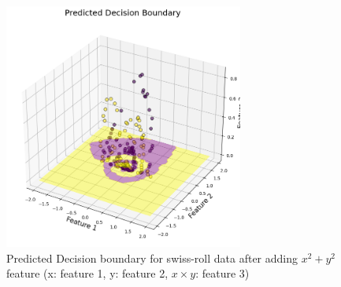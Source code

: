 \begin{solve}
\begin{figure}[H]
    \includegraphics[width=0.7\textwidth]{plots/7_spiral_db.png}
    \caption{Predicted Decision boundary for swiss-roll data after adding $x^2 + y^2$ feature (x: feature 1, y: feature 2, $x\times y$: feature 3)}
\end{figure}

\end{solve}